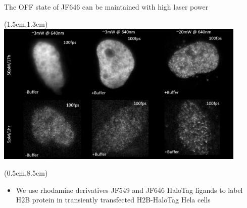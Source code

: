 \documentclass{beamer}					%
\begin{document}
\begin{frame}{The OFF state of JF646 can be maintained with high laser power}
\begin{textblock*}{12cm}(1.5cm,1.3cm)
\includegraphics[width=12cm]{Laser.png}
\end{textblock*}
\begin{textblock*}{12cm}(0.5cm,8.5cm)
\begin{itemize}
\item We use rhodamine derivatives JF549 and JF646 HaloTag ligands to label H2B protein in transiently transfected H2B-HaloTag Hela cells
\end{itemize}
\end{textblock*}
\end{frame}
\end{document}
